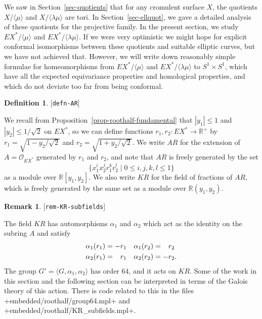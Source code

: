 \documentclass[reqno]{amsart}
\newcommand{\lbl}[1]{\label{#1}\textup{[\texttt{#1}]}\par}
\newcommand{\lbl}{\label}
\newcommand{\al}        {\alpha}
\newcommand{\lm}        {\lambda}
\newcommand{\R}         {{\mathbb{R}}}
\newcommand{\ip}[1]     {\langle #1\rangle}
\newcommand{\st}        {\;|\;}
\newcommand{\tm}        {\times}
\newcommand{\rt}        {\sqrt{2}}
\newcommand{\CO}        {\mathcal{O}}
\newcommand{\pp}        {\hphantom{+}}
\renewcommand{\:}{\colon}
\theoremstyle{definition}
\newtheorem{remark}[theorem]{Remark}
\newtheorem{definition}[theorem]{Definition}
\begin{document}
We saw in Section~\ref{sec-quotients} that for any cromulent surface
$X$, the quotients $X/\ip{\mu}$ and $X/\ip{\lm\mu}$ are tori.  In
Section~\ref{sec-ellquot}, we gave a detailed analysis of these
quotients for the projective family.  In the present section, we study
$EX^*/\ip{\mu}$ and $EX^*/\ip{\lm\mu}$.  If we were very optimistic we
might hope for explicit conformal isomorphisms between these quotients
and suitable elliptic curves, but we have not achieved that.  However,
we will write down reasonably simple formulae for homeomorphisms from
$EX^*/\ip{\mu}$ and $EX^*/\ip{\lm\mu}$ to $S^1\tm S^1$, which have all
the expected equivariance properties and homological properties, and
which do not deviate too far from being conformal.

\begin{definition}\lbl{defn-AR}
 We recall from Proposition~\ref{prop-roothalf-fundamental} that
 $|y_1|\leq 1$ and $|y_2|\leq 1/\rt$ on $EX^*$, so we can define functions
 $r_1,r_2\:EX^*\to\R^+$ by $r_1=\sqrt{1-y_2/\rt}$ and
 $r_2=\sqrt{1+y_2/\rt}$.  We write $AR$ for the extension of
 $A=\CO_{EX^*}$ generated by $r_1$ and $r_2$, and note that $AR$ is
 freely generated by the set
 \[ \{x_1^ix_2^jr_1^kr_2^l\st 0\leq i,j,k,l\leq 1\} \]
 as a module over $\R[y_1,y_2]$.  We also write $KR$ for the field of
 fractions of $AR$, which is freely generated by the same set as a
 module over $\R(y_1,y_2)$.
\end{definition}

\begin{remark}\lbl{rem-KR-subfields}
 The field $KR$ has automorphisms $\al_1$ and $\al_2$ which act as the
 identity on the subring $A$ and satisfy
 \begin{align*}
  \al_1(r_1) &=    -r_1 & \al_1(r_2) &= \pp r_2 \\
  \al_2(r_1) &= \pp r_1 & \al_2(r_2) &= -r_2.
 \end{align*}
 The group $G'=\ip{G,\al_1,\al_2}$ has order $64$, and it acts on
 $KR$.  Some of the work in this section and the following section can
 be interpreted in terms of the Galois theory of this action.  There
 is code related to this in the files
 \fname+embedded/roothalf/group64.mpl+ and
 \fname+embedded/roothalf/KR_subfields.mpl+.
\end{remark}
\end{document}
